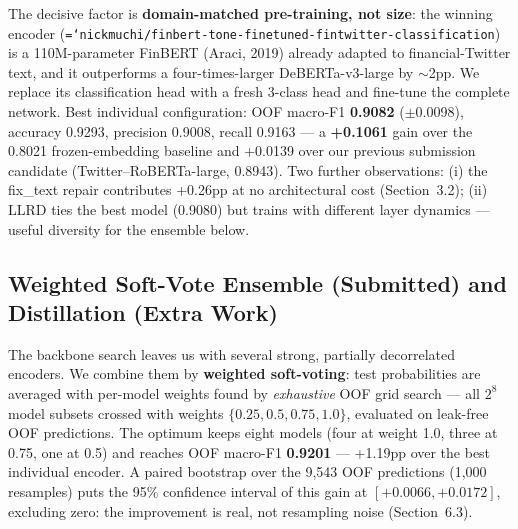 \documentclass[11pt,a4paper]{article}
\newcommand{\ttt}[1]{\texttt{\hyphenchar\font=`\-\relax #1}}
\begin{document}
The decisive factor is \textbf{domain-matched pre-training, not size}: the winning encoder
(\ttt{nickmuchi/finbert-tone-finetuned-fintwitter-classification}) is a 110M-parameter FinBERT
(Araci, 2019) already adapted to financial-Twitter text, and it outperforms a four-times-larger
DeBERTa-v3-large by $\sim$2pp. We replace its classification head with a fresh 3-class head and
fine-tune the complete network. Best individual configuration: OOF macro-F1 \textbf{0.9082}
($\pm$0.0098), accuracy 0.9293, precision 0.9008, recall 0.9163 --- a \textbf{+0.1061} gain over
the 0.8021 frozen-embedding baseline and +0.0139 over our previous submission candidate
(Twitter--RoBERTa-large, 0.8943). Two further observations: (i) the fix\_text repair contributes
+0.26pp at no architectural cost (Section~3.2); (ii) LLRD ties the best model (0.9080) but trains
with different layer dynamics --- useful diversity for the ensemble below.

\subsection{Weighted Soft-Vote Ensemble (Submitted) and Distillation (Extra Work)}
\label{sec:distill}
The backbone search leaves us with several strong, partially decorrelated encoders. We combine them
by \textbf{weighted soft-voting}: test probabilities are averaged with per-model
weights found by \emph{exhaustive} OOF grid search --- all $2^8$ model subsets crossed with weights
$\{0.25, 0.5, 0.75, 1.0\}$, evaluated on leak-free OOF predictions. The optimum keeps eight models
(four at weight 1.0, three at 0.75, one at 0.5) and reaches OOF macro-F1 \textbf{0.9201} ---
+1.19pp over the best individual encoder. A paired bootstrap over the 9{,}543 OOF predictions
(1{,}000 resamples) puts the 95\% confidence interval of this gain at $[+0.0066, +0.0172]$,
excluding zero: the improvement is real, not resampling noise (Section~6.3).
\end{document}
